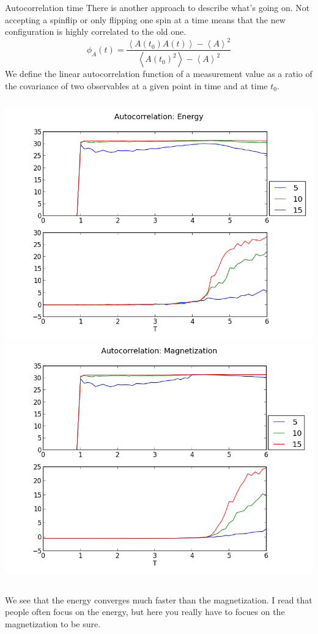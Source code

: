 \documentclass[]{beamer}
\begin{document}
\begin{frame}{Autocorrelation time}
 {There is another approach to describe what's going on. Not accepting a spinflip or only flipping one spin at a time means that the new configuration is highly correlated to the old one.}
\pause
\[ \phi_{A}(t) = \frac{\left< A(t_0)A(t) \right> - \left< A \right>^2}{\left< A(t_0)^2 \right> - \left< A \right>^2} \]
 {We define the linear autocorrelation function of a measurement value as a ratio of the covariance of two observables at a given point in time and at time \(t_0\).}
\begin{columns}[c]
	\pause
	\includegraphics[width=\textwidth]{../results/measurements/autocorr_energy.png}
	\pause
	\includegraphics[width=\textwidth]{../results/measurements/autocorr_magnetization.png}
\end{columns}
 {We see that the energy converges much faster than the magnetization. I read that people often focus on the energy, but here you really have to focues on the magnetization to be sure.}
\end{frame}
\end{document}
